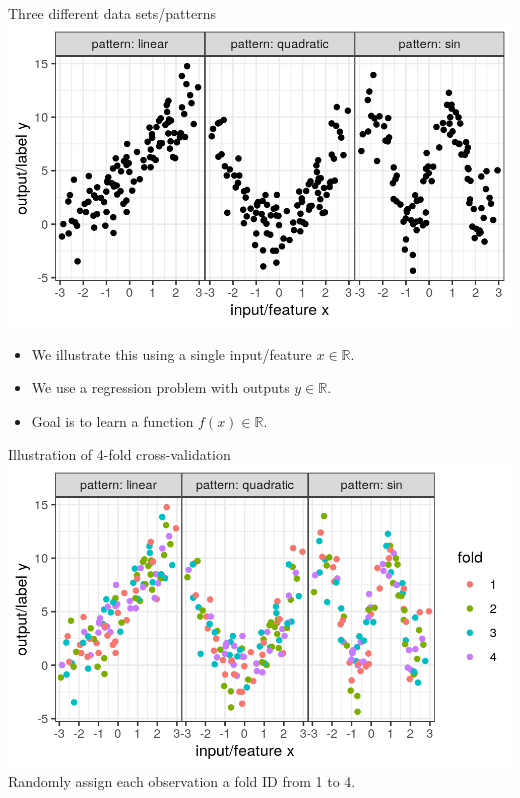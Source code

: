 \documentclass{article}
\begin{document}
{Three different data sets/patterns}
\includegraphics[width=\textwidth]{figure-overfitting-data}
\begin{itemize}
\item We illustrate this using a single input/feature
  $x\in\mathbb R$.
\item We use a regression problem with outputs $y\in\mathbb R$.
\item Goal is to learn a function $f(x)\in\mathbb R$.
\end{itemize}

{Illustration of 4-fold cross-validation}
\includegraphics[width=\textwidth]{figure-overfitting-data-folds}
Randomly assign each observation a fold ID from 1 to 4.
\end{document}
